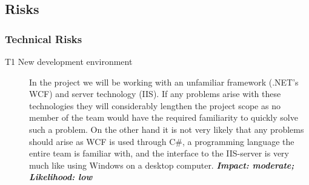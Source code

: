 \subsection{Risks}
\label{app:risks-appendix}

\subsubsection{Technical Risks}
\begin{description}
    \item[T1 New development environment] In the project we will be working with an unfamiliar
        framework (.NET’s WCF) and server technology (IIS). If any problems arise with these
        technologies they will considerably lengthen the project scope as no member of the team
        would have the required familiarity to quickly solve such a problem. On the other hand
        it is not very likely that any problems should arise as WCF is used through C#, a
        programming language the entire team is familiar with, and the interface to the IIS-server
        is very much like using Windows on a desktop computer.\newline
        \textbf{\emph{Impact: moderate; Likelihood: low}}
\end{description}